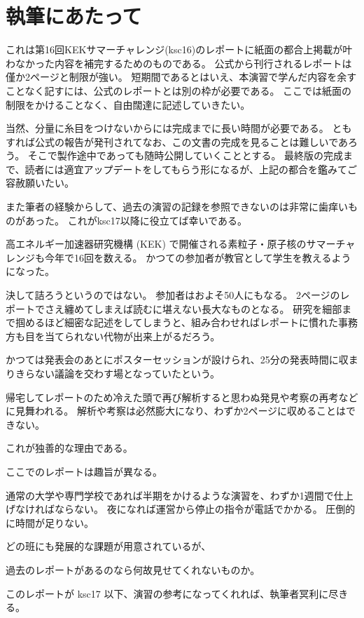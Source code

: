 \section*{執筆にあたって}

これは第16回KEKサマーチャレンジ(ksc16)のレポートに紙面の都合上掲載が叶わなかった内容を補完するためのものである。
公式から刊行されるレポートは僅か2ページと制限が強い。
短期間であるとはいえ、本演習で学んだ内容を余すことなく記すには、公式のレポートとは別の枠が必要である。
ここでは紙面の制限をかけることなく、自由闊達に記述していきたい。

当然、分量に糸目をつけないからには完成までに長い時間が必要である。
ともすれば公式の報告が発刊されてなお、この文書の完成を見ることは難しいであろう。
そこで製作途中であっても随時公開していくこととする。
最終版の完成まで、読者には適宜アップデートをしてもらう形になるが、上記の都合を鑑みてご容赦願いたい。

また筆者の経験からして、過去の演習の記録を参照できないのは非常に歯痒いものがあった。
これがksc17以降に役立てば幸いである。


高エネルギー加速器研究機構 (KEK) で開催される素粒子・原子核のサマーチャレンジも今年で16回を数える。
かつての参加者が教官として学生を教えるようになった。


決して詰ろうというのではない。
参加者はおよそ50人にもなる。
2ページのレポートでさえ纏めてしまえば読むに堪えない長大なものとなる。
研究を細部まで掴めるほど細密な記述をしてしまうと、組み合わせればレポートに慣れた事務方も目を当てられない代物が出来上がるだろう。


かつては発表会のあとにポスターセッションが設けられ、25分の発表時間に収まりきらない議論を交わす場となっていたという。

帰宅してレポートのため冷えた頭で再び解析すると思わぬ発見や考察の再考などに見舞われる。
解析や考察は必然膨大になり、わずか2ページに収めることはできない。

これが独善的な理由である。

ここでのレポートは趣旨が異なる。

通常の大学や専門学校であれば半期をかけるような演習を、わずか1週間で仕上げなければならない。
夜になれば運営から停止の指令が電話でかかる。
圧倒的に時間が足りない。

どの班にも発展的な課題が用意されているが、

過去のレポートがあるのなら何故見せてくれないものか。

このレポートが ksc17 以下、演習の参考になってくれれば、執筆者冥利に尽きる。
